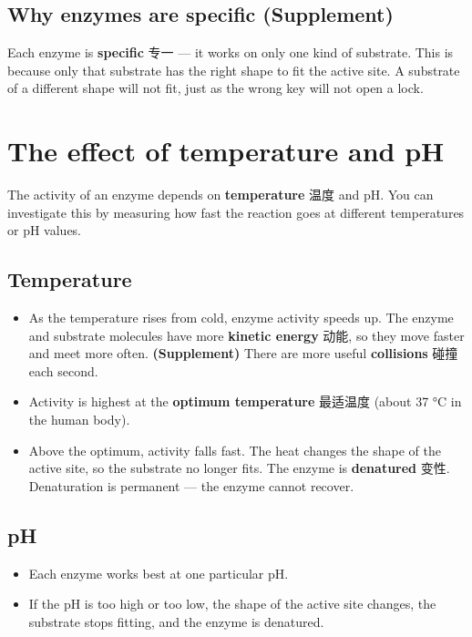 \documentclass[11pt]{article}
\begin{document}
\subsection*{Why enzymes are specific (Supplement)}

Each enzyme is \textbf{specific} 专一 — it works on only one kind of substrate. This is because only that substrate has the right shape to fit the active site. A substrate of a different shape will not fit, just as the wrong key will not open a lock.

\section*{The effect of temperature and pH}

The activity of an enzyme depends on \textbf{temperature} 温度 and pH. You can investigate this by measuring how fast the reaction goes at different temperatures or pH values.

\subsection*{Temperature}

\begin{itemize}
\item As the temperature rises from cold, enzyme activity speeds up. The enzyme and substrate molecules have more \textbf{kinetic energy} 动能, so they move faster and meet more often. \textbf{(Supplement)} There are more useful \textbf{collisions} 碰撞 each second.

\item Activity is highest at the \textbf{optimum temperature} 最适温度 (about 37 °C in the human body).

\item Above the optimum, activity falls fast. The heat changes the shape of the active site, so the substrate no longer fits. The enzyme is \textbf{denatured} 变性. Denaturation is permanent — the enzyme cannot recover.

\end{itemize}

\subsection*{pH}

\begin{itemize}
\item Each enzyme works best at one particular pH.

\item If the pH is too high or too low, the shape of the active site changes, the substrate stops fitting, and the enzyme is denatured.

\end{itemize}
\end{document}
